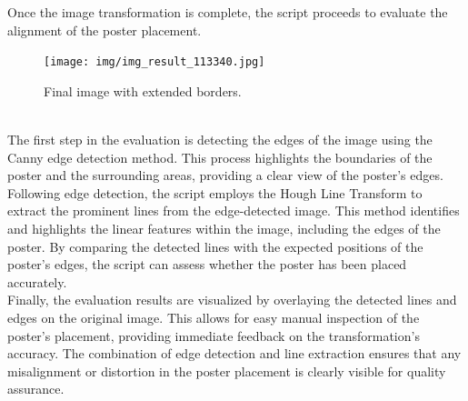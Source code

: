 \documentclass[a4paper,twocolumn]{article}
\begin{document}
Once the image transformation is complete, the script proceeds to evaluate the alignment of the poster placement.
\begin{figure}[htbp]
    \centering
    \texttt{[image: img/img\_result\_113340.jpg]} %
    \caption{Final image with extended borders.}
    \label{fig:example-result}
\end{figure}
 \\
 The first step in the evaluation is detecting the edges of the image using the Canny edge detection method. This process highlights the boundaries of the poster and the surrounding areas, providing a clear view of the poster's edges.
Following edge detection, the script employs the Hough Line Transform to extract the prominent lines from the edge-detected image. This method identifies and highlights the linear features within the image, including the edges of the poster. By comparing the detected lines with the expected positions of the poster's edges, the script can assess whether the poster has been placed accurately. \cite{stackoverflow}
\\
Finally, the evaluation results are visualized by overlaying the detected lines and edges on the original image. This allows for easy manual inspection of the poster’s placement, providing immediate feedback on the transformation’s accuracy. The combination of edge detection and line extraction ensures that any misalignment or distortion in the poster placement is clearly visible for quality assurance.
\end{document}
